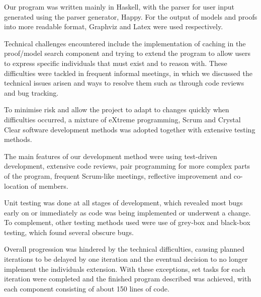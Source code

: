 
Our program was written mainly in Haskell, with the parser for user input generated using the parser generator, Happy. For the output of models and proofs into more readable format, Graphviz and Latex were used respectively.

Technical challenges encountered include the implementation of caching in the proof/model search component and trying to extend the program to allow users to express specific individuals that must exist and to reason with. These difficulties were tackled in frequent informal meetings, in which we discussed the technical issues arisen and ways to resolve them such as through code reviews and bug tracking.

To minimise risk and allow the project to adapt to changes quickly when difficulties occurred, a mixture of eXtreme programming, Scrum and Crystal Clear software development methods was adopted together with extensive testing methods.

The main features of our development method were using test-driven development, extensive code reviews, pair programming for more complex parts of the program, frequent Scrum-like meetings, reflective improvement and co-location of members.

Unit testing was done at all stages of development, which revealed most bugs early on or immediately as code was being implemented or underwent a change. To complement, other testing methods used were use of grey-box and black-box testing, which found several obscure bugs.

Overall progression was hindered by the technical difficulties, causing planned iterations to be delayed by one iteration and the eventual decision to no longer implement the individuals extension. With these exceptions, set tasks for each iteration were completed and the finished program described was achieved, with each component consisting of about 150 lines of code.